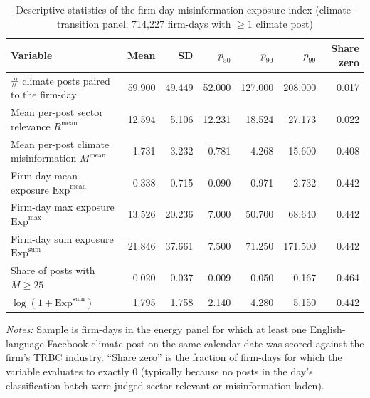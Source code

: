 \begin{table}[htbp]
\centering
\caption{Descriptive statistics of the firm-day misinformation-exposure index (climate-transition panel, 714,227 firm-days with $\geq 1$ climate post)}
\label{tab:v2_descriptive}
\begin{threeparttable}
\footnotesize\setlength{\tabcolsep}{3pt}\begin{tabular}{p{}rrrrrr}
\toprule
Variable & Mean & SD & $p_{50}$ & $p_{90}$ & $p_{99}$ & Share zero \\
\midrule
\# climate posts paired to the firm-day & 59.900 & 49.449 & 52.000 & 127.000 & 208.000 & 0.017 \\
Mean per-post sector relevance $R^{\text{mean}}$ & 12.594 & 5.106 & 12.231 & 18.524 & 27.173 & 0.022 \\
Mean per-post climate misinformation $M^{\text{mean}}$ & 1.731 & 3.232 & 0.781 & 4.268 & 15.600 & 0.408 \\
Firm-day mean exposure $\mathrm{Exp}^{\text{mean}}$ & 0.338 & 0.715 & 0.090 & 0.971 & 2.732 & 0.442 \\
Firm-day max exposure $\mathrm{Exp}^{\text{max}}$ & 13.526 & 20.236 & 7.000 & 50.700 & 68.640 & 0.442 \\
Firm-day sum exposure $\mathrm{Exp}^{\text{sum}}$ & 21.846 & 37.661 & 7.500 & 71.250 & 171.500 & 0.442 \\
Share of posts with $M\geq 25$ & 0.020 & 0.037 & 0.009 & 0.050 & 0.167 & 0.464 \\
$\log(1+\mathrm{Exp}^{\text{sum}})$ & 1.795 & 1.758 & 2.140 & 4.280 & 5.150 & 0.442 \\
\bottomrule
\end{tabular}
\begin{tablenotes}\small
\item \textit{Notes:} Sample is firm-days in the energy panel for which at least one English-language Facebook
climate post on the same calendar date was scored against the firm's TRBC industry. ``Share zero'' is the
fraction of firm-days for which the variable evaluates to exactly 0 (typically because no posts in the day's
classification batch were judged sector-relevant or misinformation-laden).
\end{tablenotes}
\end{threeparttable}
\end{table}